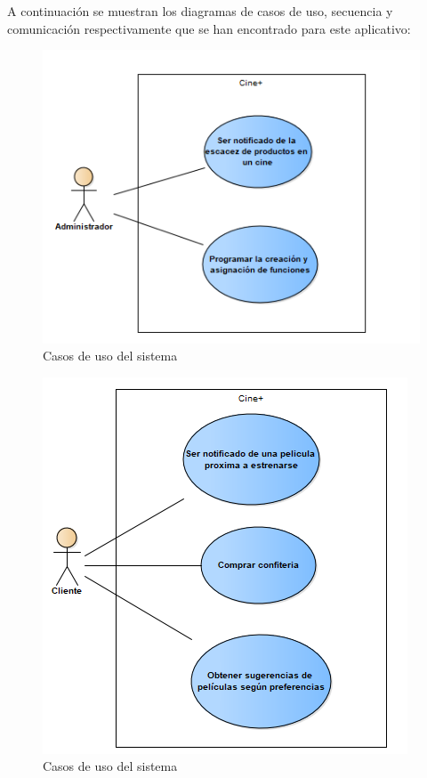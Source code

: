  A continuación se muestran los diagramas de casos de uso, secuencia y comunicación respectivamente que se han encontrado para este aplicativo:

\begin{figure}[h!]
	\centering
\includegraphics[width=.6\linewidth]{diseno/requerimientos/imgs/casosUso1}
	\caption{Casos de uso del sistema}
\end{figure}

\begin{figure}[h!]
	\centering
\includegraphics[width=.6\linewidth]{diseno/requerimientos/imgs/casosUso2}
	\caption{Casos de uso del sistema}
\end{figure}


